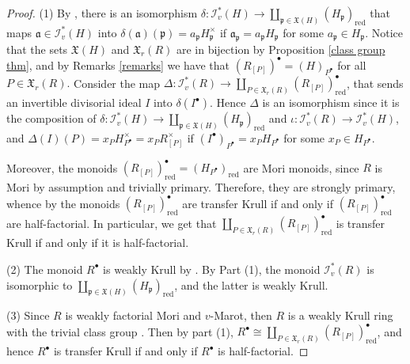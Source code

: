 \documentclass[a4paper, 10pt]{amsart}
\theoremstyle{plain}
\theoremstyle{definition}
\theoremstyle{remark}
\numberwithin{equation}{section}
\begin{document}
\begin{proof} 
    (1) By \cite[Proposition 5.3]{GKR15}, there is an isomorphism $\delta\colon\mathcal{I}_v^*(H)\to \coprod_{\mathfrak{p}\in \mathfrak{X}(H)}(H_{\mathfrak{p}})_{\mathrm{red}}$ that maps $\mathfrak{a}\in \mathcal{I}_v^*(H)$ into $\delta(\mathfrak{a})(\mathfrak{p})=a_\mathfrak{p}H_{\mathfrak{p}}^\times$ if $\mathfrak{a}_{\mathfrak{p}}=a_\mathfrak{p}H_{\mathfrak{p}}$ for some $a_\mathfrak{p}\in H_\mathfrak{p}$. Notice that the sets $\mathfrak{X}(H)$ and $\mathfrak{X}_r(R)$ are in bijection by Proposition \ref{class group thm}, and by Remarks \ref{remarks} we have that $(R_{[P]})^\bullet=(H)_{P^\bullet}$ for all $P\in \mathfrak{X}_r(R).$ 
    Consider the map  $\Delta \colon\mathcal{I}_v^*(R)\to \coprod_{P\in \mathfrak{X}_r(R)}(R_{[P]})^\bullet_{\mathrm{red}}$, that sends an invertible divisorial ideal $I$ into $\delta(I^\bullet)$. Hence $\Delta$ is an isomorphism since it is the composition of $\delta\colon \mathcal{I}_v^*(H)\to \coprod_{\mathfrak{p}\in \mathfrak{X}(H)}(H_{\mathfrak{p}})_{\mathrm{red}} $ and $\iota\colon \mathcal{I}_v^*(R)\to \mathcal{I}_v^*(H)$, and $\Delta(I)(P)=x_{P}H^\times_{P^\bullet}=x_{P}R^\times_{[P]}$ if $(I^\bullet)_{P^\bullet}=x_PH_{P^\bullet}$ for some $x_P\in H_{P^\bullet}$.
    
   Moreover, the monoids $(R_{[P]})^\bullet_{\mathrm{red}}= (H_{P^\bullet})_{\mathrm{red}}$ are Mori monoids, since $R$ is Mori by assumption and trivially primary. Therefore, they are strongly primary, whence by \cite[Theorem 5.5]{GSZ17} the monoids $(R_{[P]})^\bullet_{\mathrm{red}}$ are transfer Krull if and only if $(R_{[P]})^\bullet_{\mathrm{red}}$ are half-factorial. In particular, we get that $\coprod_{P\in \mathfrak{X}_r(R)}(R_{[P]})^\bullet_{\mathrm{red}} $ is transfer Krull if and only if it is half-factorial.

    (2) The monoid $R^\bullet$ is weakly Krull by \cite[Theorem 4.4]{CO22}. By Part (1), the monoid $\mathcal{I}_v^*(R)$ is isomorphic to $\coprod_{\mathfrak{p}\in \mathfrak{X}(H)}(H_\mathfrak{p})_{\mathrm{red}}$, and the latter is weakly Krull.
    
    (3) Since $R$ is weakly factorial Mori and $v$-Marot, then $R$ is a weakly Krull ring with the trivial class group \cite[Proposition 4.7]{CO22}. Then by part (1), $R^\bullet \cong \coprod_{P\in \mathfrak{X}_r(R)}(R_{[P]})^\bullet_{\mathrm{red}}$, and hence $R^\bullet$ is transfer Krull if and only if $R^\bullet$ is half-factorial.
\end{proof}
\end{document}
